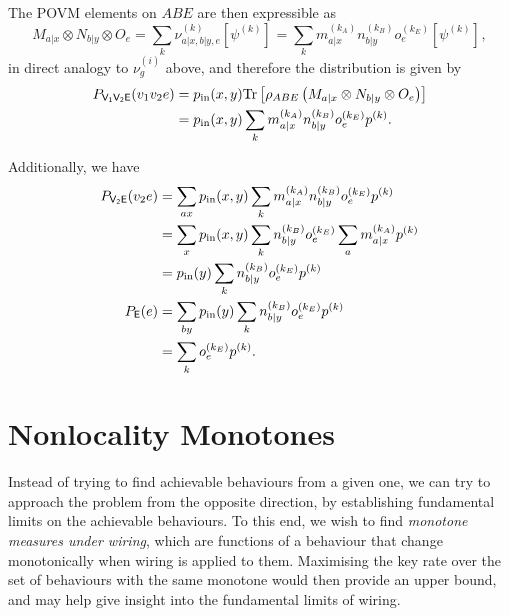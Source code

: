 \documentclass[10pt, a4paper]{article}
\numberwithin{equation}{section} %
\theoremstyle{definition}
\theoremstyle{plain}
\newcommand{\?}{\mathrel{?}} %
\newcommand{\Tr}{\mathrm{Tr}} %
\newcommand{\crv}[1]{\mathsf{#1}}
\newcommand{\proj}[2][]{{[#2]}_{#1}}
\begin{document}
    The POVM elements on \(ABE\) are then expressible as
    \begin{equation}
      M_{a|x} \otimes N_{b|y} \otimes O_e = \sum_k \nu^{(k)}_{a|x,b|y,e} \proj{\psi^{(k)}} = \sum_k m_{a|x}^{(k_A)} n_{b|y}^{(k_B)} o_e^{(k_E)} \proj{\psi^{(k)}},
    \end{equation}
    in direct analogy to \(\nu_{g}^{(i)}\) above, and therefore the distribution is given by
    \begin{align}
      P_{\crv{V_1V_2E}}(v_1v_2e) &= p_{\rm in}(x,y) \Tr\left[\rho_{ABE} \left(M_{a|x} \otimes N_{b|y} \otimes O_e\right)\right] \\
                                 &= p_{\rm in}(x,y) \sum_k m_{a|x}^{(k_A)} n_{b|y}^{(k_B)} o_e^{(k_E)} p^{(k)}.
    \end{align}

    Additionally, we have
    \begin{align}
      P_{\crv{V_2E}}(v_2e) &= \sum_{ax} p_{\rm in}(x,y) \sum_k m_{a|x}^{(k_A)} n_{b|y}^{(k_B)} o_e^{(k_E)} p^{(k)} \\
                           &= \sum_{x} p_{\rm in}(x,y) \sum_k n_{b|y}^{(k_B)} o_e^{(k_E)} \sum_a m_{a|x}^{(k_A)} p^{(k)} \\
                           &= p_{\rm in}(y) \sum_k n_{b|y}^{(k_B)} o_e^{(k_E)} p^{(k)} \\
      P_{\crv{E}}(e) &= \sum_{by} p_{\rm in}(y) \sum_k n_{b|y}^{(k_B)} o_e^{(k_E)} p^{(k)} \\
                     &= \sum_k o_e^{(k_E)} p^{(k)}.
    \end{align}

    \section{Nonlocality Monotones}\label{sec:nlmono}

    Instead of trying to find achievable behaviours from a given one, we can try to approach the problem from the opposite direction, by establishing fundamental limits on the achievable behaviours. To this end, we wish to find \emph{monotone measures under wiring}, which are functions of a behaviour that change monotonically when wiring is applied to them. Maximising the key rate over the set of behaviours with the same monotone would then provide an upper bound, and may help give insight into the fundamental limits of wiring.
\end{document}
